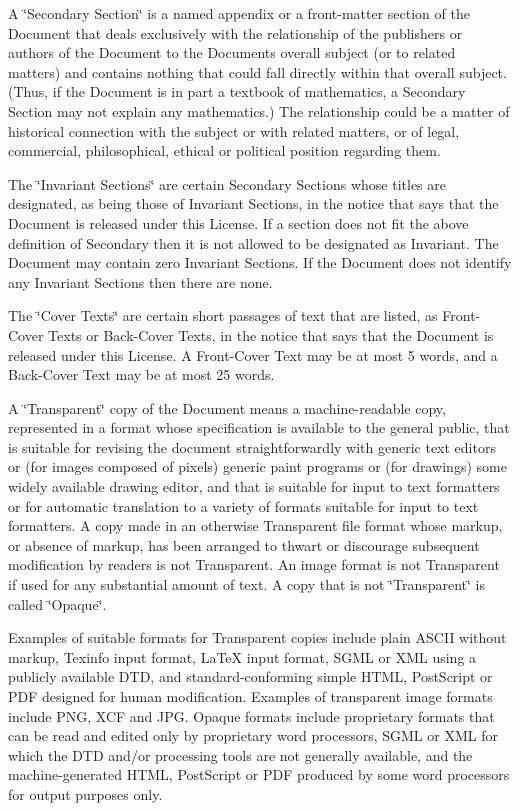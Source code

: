 A \char`\"{}\+Secondary Section\char`\"{} is a named appendix or a front-\/matter section of the Document that deals exclusively with the relationship of the publishers or authors of the Document to the Document\textquotesingle{}s overall subject (or to related matters) and contains nothing that could fall directly within that overall subject. (Thus, if the Document is in part a textbook of mathematics, a Secondary Section may not explain any mathematics.) The relationship could be a matter of historical connection with the subject or with related matters, or of legal, commercial, philosophical, ethical or political position regarding them.

The \char`\"{}\+Invariant Sections\char`\"{} are certain Secondary Sections whose titles are designated, as being those of Invariant Sections, in the notice that says that the Document is released under this License. If a section does not fit the above definition of Secondary then it is not allowed to be designated as Invariant. The Document may contain zero Invariant Sections. If the Document does not identify any Invariant Sections then there are none.

The \char`\"{}\+Cover Texts\char`\"{} are certain short passages of text that are listed, as Front-\/\+Cover Texts or Back-\/\+Cover Texts, in the notice that says that the Document is released under this License. A Front-\/\+Cover Text may be at most 5 words, and a Back-\/\+Cover Text may be at most 25 words.

A \char`\"{}\+Transparent\char`\"{} copy of the Document means a machine-\/readable copy, represented in a format whose specification is available to the general public, that is suitable for revising the document straightforwardly with generic text editors or (for images composed of pixels) generic paint programs or (for drawings) some widely available drawing editor, and that is suitable for input to text formatters or for automatic translation to a variety of formats suitable for input to text formatters. A copy made in an otherwise Transparent file format whose markup, or absence of markup, has been arranged to thwart or discourage subsequent modification by readers is not Transparent. An image format is not Transparent if used for any substantial amount of text. A copy that is not \char`\"{}\+Transparent\char`\"{} is called \char`\"{}\+Opaque\char`\"{}.

Examples of suitable formats for Transparent copies include plain A\+S\+C\+II without markup, Texinfo input format, La\+TeX input format, S\+G\+ML or X\+ML using a publicly available D\+TD, and standard-\/conforming simple H\+T\+ML, Post\+Script or P\+DF designed for human modification. Examples of transparent image formats include P\+NG, X\+CF and J\+PG. Opaque formats include proprietary formats that can be read and edited only by proprietary word processors, S\+G\+ML or X\+ML for which the D\+TD and/or processing tools are not generally available, and the machine-\/generated H\+T\+ML, Post\+Script or P\+DF produced by some word processors for output purposes only.

